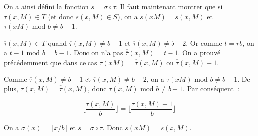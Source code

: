      On a ainsi défini la fonction $\overline{s} = \sigma \circ \overline{\tau}$.  Il faut maintenant montrer que si $\overline{\tau}(x,M) \in T$ (et donc $\overline{s}(x,M) \in S$), on a $s(xM)=\overline{s}(x,M)$ et $\tau(xM) \text{\ mod } b \neq b - 1$.

     $\overline{\tau}(x,M) \in T$ quand $\overline{\overline{\tau}}(x,M) \neq b - 1$ et $\overline{\overline{\tau}}(x,M) \neq b - 2$. Or comme $t = rb$, on a $t - 1 \text{\ mod } b = b - 1$. Donc on n'a pas $\overline{\overline{\tau}}(x,M) = t - 1$. On a prouvé précédemment que dans ce cas $\tau(xM) = \overline{\overline{\tau}}(x,M)$ ou $\overline{\overline{\tau}}(x,M) + 1$.

     Comme $\overline{\overline{\tau}}(x,M) \neq b - 1$ et $\overline{\overline{\tau}}(x,M) \neq b - 2$, on a $\tau(xM) \text{\ mod } b \neq b - 1$. De plus, $\overline{\tau}(x,M) = \overline{\overline{\tau}}(x,M)$, donc $\overline{\tau}(x,M) \text{\ mod } b \neq b - 1$. Par conséquent~:

     $$\lfloor \frac{\overline{\tau}(x,M)}{b} \rfloor = \lfloor \frac{\overline{\tau}(x,M) + 1}{b} \rfloor$$

     On a $\sigma(x) = \lfloor x/b \rfloor$ et $s= \sigma \circ \tau$. Donc $s(xM) = \overline{s}(x,M)$.
